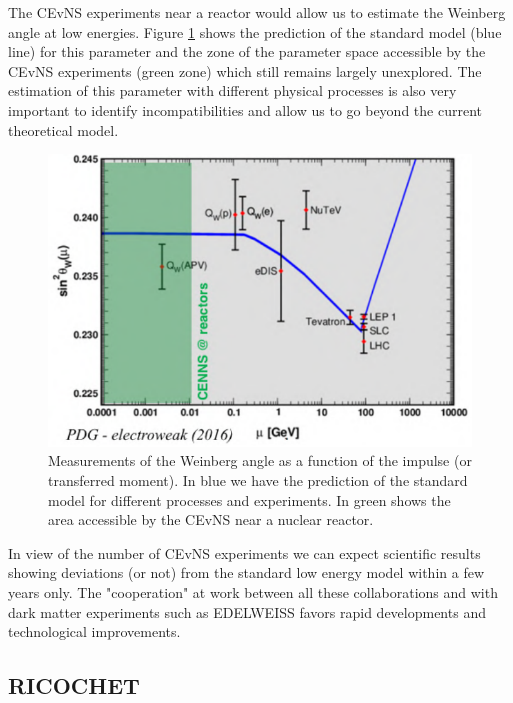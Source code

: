 The CEvNS experiments near a reactor would allow us to estimate the Weinberg angle at low energies. Figure \ref{fig:weinberg-angle} shows the prediction of the standard model (blue line) for this parameter and the zone of the parameter space accessible by the CEvNS experiments (green zone) which still remains largely unexplored. The estimation of this parameter with different physical processes is also very important to identify incompatibilities and allow us to go beyond the current theoretical model.

\begin{figure}
\centering
\includegraphics[scale=1]{Figures/Introduction/weinberg_angle.pdf}
\caption{Measurements of the Weinberg angle as a function of the impulse (or transferred moment). In
blue we have the prediction of the standard model for different processes and experiments. In
green shows the area accessible by the CEvNS near a nuclear reactor.}
\label{fig:weinberg-angle}
\end{figure}

In view of the number of CEvNS experiments we can expect scientific results showing deviations (or not) from the standard low energy model within a few years only. The "cooperation" at work between all these collaborations and with dark matter experiments such as EDELWEISS favors rapid developments and technological improvements.


\subsection{RICOCHET}

